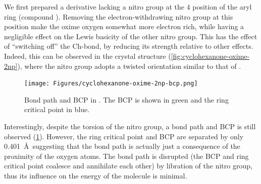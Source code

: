 \begin{refsection}
We first prepared a derivative lacking a nitro group at the 4 position of the aryl ring (compound ).
Removing the electron-withdrawing nitro group at this position make the oxime oxygen somewhat more electron rich, while having a negligible effect on the Lewis basicity of the other nitro group.
This has the effect of ``switching off'' the Ch-bond, by reducing its strength relative to other effects.
Indeed, this can be observed in the crystal structure (\cref{fig:cyclohexanone-oxime-2np}), where the nitro group adopts a twisted orientation similar to that of .

\begin{figure}
    \texttt{[image: Figures/cyclohexanone-oxime-2np-bcp.png]}
    \caption[Bond path and BCP in .]{Bond path and BCP in . The BCP is shown in green and the ring critical point in blue.}\label{fig:cyclohexanone-oxime-2np-bcp}
\end{figure}

Interestingly, despite the torsion of the nitro group, a bond path and BCP is still observed (\cref{fig:cyclohexanone-oxime-2np-bcp}).
However, the ring critical point and BCP are separated by only 0.401~\AA\ suggesting that the bond path is actually just a consequence of the proximity of the oxygen atoms.
The bond path is disrupted (the BCP and ring critical point coalesce and annihilate each other) by libration of the nitro group, thus its influence on the energy of the molecule is minimal.\autocite{Farrugia2006}


\end{refsection}
